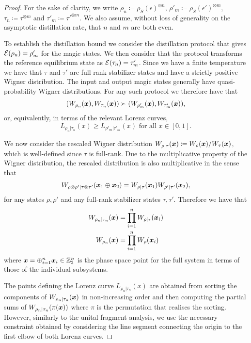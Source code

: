 \documentclass[pra,
aps,
twocolumn,
superscriptaddress,
groupedaddress,
nofootinbib,
reprint
]{revtex4-1}
\begin{document}
\begin{proof}	\label{thm:free-energy-bound-proof}
For the sake of clarity, we write $\rho_n \coloneqq \rho_S(\epsilon)^{\otimes n}$, $\rho'_m \coloneqq \rho_S(\epsilon')^{\otimes m}$, $\tau_n \coloneqq \tau^{\otimes m}$ and $\tau'_m \coloneqq \tau'^{\otimes m}$.  We also assume, without loss of generality on the asymptotic distillation rate, that $n$ and $m$ are both even.

To establish the distillation bound we consider the distillation protocol that gives ${\mathcal E}( \rho_n) = \rho'_m$ for the magic states. 
We then consider that the protocol transforms the reference equilibrium state as ${\mathcal E}( \tau_n) = \tau'_m$.
Since we have a finite temperature we have that $\tau$ and $\tau'$ are full rank stabilizer states and have a strictly positive Wigner distribution. The input and output magic states generally have quasi-probability Wigner distributions. 
For any such protocol we therefore have that
\begin{equation}
	( W_{\rho_n}(\bm{x}), W_{\tau_n}(\bm{x}) ) \succ ( W_{\rho'_m}(\bm{x}), W_{\tau'_m}(\bm{x}) ),
\end{equation}
or, equivalently, in terms of the relevant Lorenz curves,
\begin{equation}
	L_{\rho_n |\tau_n}(x) \ge L_{\rho'_m |\tau'_m}(x) \mbox{ for all } x \in [0,1].
\end{equation}

We now consider the rescaled Wigner distribution $W_{\rho | \tau}(\boldsymbol{x}) \coloneqq W_\rho(\boldsymbol{x})/W_\tau(\boldsymbol{x})$, which is well-defined since $\tau$ is full-rank. 
Due to the multiplicative property of the Wigner distribution, the rescaled distribution is also multiplicative in the sense that
\begin{equation}
	W_{\rho \otimes \rho' | \tau \otimes \tau'} (\boldsymbol{x}_1 \oplus \boldsymbol{x}_2) = W_{\rho | \tau}(\boldsymbol{x}_1)W_{\rho' | \tau'}(\boldsymbol{x}_2),
\end{equation}
for any states $\rho, \rho'$ and any full-rank stabilizer states $\tau, \tau'$.
Therefore we have that
\begin{align}
	W_{\rho_n |\tau_n} (\boldsymbol{x}) &= \prod_{i=1}^n W_{\rho|\tau}(\boldsymbol{x}_i)\\
	W_{\rho_n } (\boldsymbol{x}) &= \prod_{i=1}^n W_\rho(\boldsymbol{x}_i)
\end{align}
where $\boldsymbol{x} = \oplus_{i=1}^n \boldsymbol{x}_i \in \mathbb{Z}_3^n$ is the phase space point for the full system in terms of those of the individual subsystems.

The points defining the Lorenz curve $L_{\rho_n |\tau_n}(x)$ are obtained from sorting the components of $W_{\rho_n |\tau_n}(\boldsymbol{x})$ in non-increasing order and then computing the partial sums of $W_{\rho_n |\tau_n}(\pi(\boldsymbol{x}))$ where $\pi$ is the permutation that realises the sorting. 
However, similarly to the unital fragment analysis, we use the necessary constraint obtained by considering the line segment connecting the origin to the first elbow of both Lorenz curves.


\end{proof}
\end{document}

